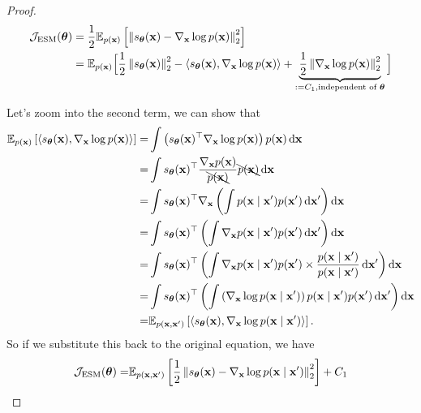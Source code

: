 \begin{proof}
    \begin{equation*}
        \begin{aligned}
            {\mathcal J}_{\text{ESM}}(\boldsymbol{\theta})&=\frac{1}{2}{\mathbb E}_{p({\bf x})}\left[\left\|s_{\boldsymbol{\theta}}({\bf x})-\nabla_{{\bf x}}\log p({\bf x})\right\|_{2}^{2}\right]\\
            & = {\mathbb E}_{p({\bf x})}\Big[\frac{1}{2}\left\|s_{\boldsymbol{\theta}}({\bf x})\right\|_{2}^{2}-\left\langle s_{\boldsymbol{\theta}}({\bf x}),\nabla_{{\bf x}}\log p({\bf x})\right\rangle+\underbrace{\frac{1}{2}\left\|\nabla_{{\bf x}}\log p({\bf x})\right\|_{2}^{2}}_{:=C_{1},\text{independent of }\boldsymbol{\theta}}\Big]
        \end{aligned}
    \end{equation*}

    Let's zoom into the second term, we can show that
    \begin{equation*}
\begin{aligned}
    \bbE_{p(\bfx)}\left[\left\langle s_{\bftheta}(\bfx),\nabla_{\bfx}\log p(\bfx)\right\rangle\right]=&\int\left(s_{\bftheta}(\bfx)^{\top}\nabla_{\bfx}\log p(\bfx)\right)p(\bfx)\dif\bfx \\
    =&\int s_{\bftheta}(\bfx)^{\top}\frac{\nabla_{\bfx}p(\bfx)}{\bcancel{p(\bfx)}}\bcancel{p(\bfx)}\dif\bfx \\
    =&\int s_{\bftheta}(\bfx)^{\top}\nabla_{\bfx}\left(\int p(\bfx\mid\bfx')p(\bfx')\dif\bfx'\right)\dif\bfx\\
    =&\int s_{\bftheta}(\bfx)^{\top}\left(\int \nabla_{\bfx}p(\bfx\mid\bfx')p(\bfx')\dif\bfx'\right)\dif\bfx \\
    = &\int s_{\bftheta}(\bfx)^{\top}\left(\int \nabla_{\bfx}p(\bfx\mid\bfx')p(\bfx')\times\frac{p(\bfx\mid\bfx')}{p(\bfx\mid\bfx')}\dif\bfx'\right)\dif\bfx\\
    =&\int s_{\bftheta}(\bfx)^{\top}\left(\int \left(\nabla_{\bfx}\log p(\bfx\mid\bfx')\right)p(\bfx\mid\bfx')p(\bfx')\dif\bfx'\right)\dif\bfx\\
    = & \bbE_{p(\bfx,\bfx')}\left[\left\langle s_{\bftheta}(\bfx),\nabla_{\bfx}\log p(\bfx\mid\bfx')\right\rangle\right].
\end{aligned}
    \end{equation*}
    So if we substitute this back to the original equation, we have
    \begin{equation*}
        \begin{aligned}
            \mcJ_{\text{ESM}}(\bftheta)=&\bbE_{p(\bfx,\bfx')}\left[\frac{1}{2}\left\|s_{\bftheta}(\bfx)-\nabla_{\bfx}\log p(\bfx\mid\bfx')\right\|_{2}^{2}\right]+C_{1}\\

\end{aligned}
\end{equation*}
\end{proof}
